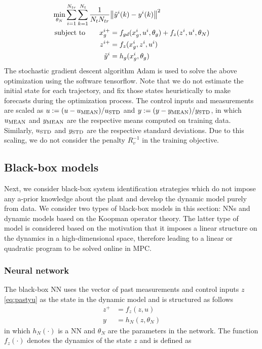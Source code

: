 \documentclass[10pt]{article}
\begin{document}
\begin{align} \label{eq:hybrid_training}
  \underset{\theta_N}{\textnormal{min}} \sum_{i=1}^{N_{tr}} \sum_{k=1}^{N_t} 
  \dfrac{1}{N_tN_{tr}} &\norm{\tilde{y}^i(k) - y^i(k)}^2  \\
  \textnormal{subject to} \quad \quad x_g^{i+} &= f_{gd}(x_g^i, u^i, \theta_g) + f_z(z^i, u^i, \theta_N) \nonumber \\
  z^{i+} &= f_z(x_g^i, z^i, u^i) \nonumber \\
   \tilde{y}^i &= h_g(x_g^i, \theta_g) \nonumber
\end{align}
The stochastic gradient descent algorithm Adam is used to solve the above optimization using the software tensorflow. Note that we do not estimate the initial state for each trajectory, and fix those states heuristically to make forecasts during the optimization process. The control inputs and measurements are scaled as $u := (u - u_{\textnormal{MEAN}})/u_{\textnormal{STD}}$ and 
$y := (y - y_{\textnormal{MEAN}})/y_{\textnormal{STD}}$, in which $u_{\textnormal{MEAN}}$ and $y_{\textnormal{MEAN}}$ are the respective means computed on training data. Similarly, $u_{\textnormal{STD}}$ and $y_{\textnormal{STD}}$ are the respective standard deviations. Due to this scaling, we do not consider the penalty $R_v^{-1}$ in the training objective.

\subsection{Black-box models}
Next, we consider black-box system identification strategies which do not impose any a-prior knowledge about the plant and develop the dynamic model purely from data. We consider two types of black-box models in this section: NNs and dynamic models based on the Koopman operator theory. The latter type of model is considered based on the motivation that it imposes a linear structure on the dynamics in a high-dimensional space, therefore leading to a linear or quadratic program to be solved online in MPC.

\subsubsection{Neural network}
The black-box NN uses the vector of past measurements and control inputs $z$ \eqref{eq:pastyu} as the state in the dynamic model and is structured as follows
\begin{align*}
  z^+ &= f_z(z, u) \\ 
  y &= h_N(z, \theta_N)
\end{align*}
in which $h_N(\cdot)$ is a NN and $\theta_N$ are the parameters in the network. The function $f_z(\cdot)$ denotes the dynamics of the state $z$ and is defined as 
\end{document}
